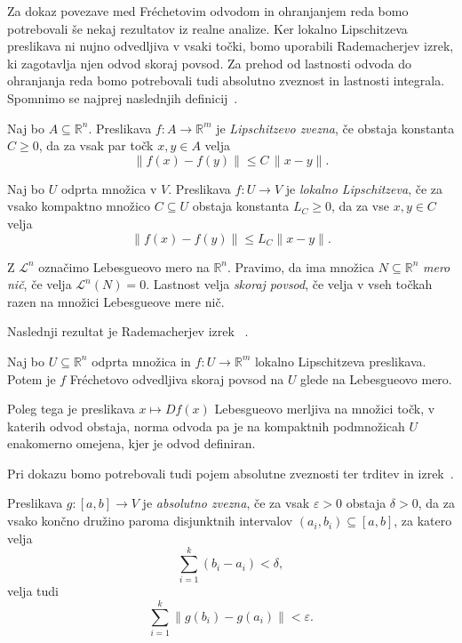\documentclass[mat2, tisk]{fmfdelo}
\begin{document}
Za dokaz povezave med Fréchetovim odvodom in ohranjanjem
reda bomo potrebovali še nekaj rezultatov iz realne analize.
Ker lokalno Lipschitzeva preslikava ni nujno odvedljiva
v vsaki točki, bomo uporabili Rademacherjev izrek, ki
zagotavlja njen odvod skoraj povsod. Za prehod od
lastnosti odvoda do ohranjanja reda bomo potrebovali
tudi absolutno zveznost in lastnosti integrala.
Spomnimo se najprej naslednjih definicij~\cite{Evans}.
\begin{definicija}
Naj bo $A \subseteq \mathbb{R}^n$. Preslikava $f \colon A \to \mathbb{R}^m$
je \emph{Lipschitzevo zvezna}, če obstaja konstanta $C \geq 0$, da za vsak par točk $x, y \in A$ velja
\[
\|f(x)-f(y)\| \leq C\,\|x-y\|.
\]
\end{definicija}

\begin{definicija}
 Naj bo $U$ odprta množica v $V$. Preslikava $f:U\to V$ je \emph{lokalno Lipschitzeva}, če za vsako kompaktno množico $C\subseteq U$
obstaja konstanta $L_C\geq 0$, da za vse $x,y\in C$ velja
\[
\|f(x)-f(y)\|\leq L_C\|x-y\|.
\]
\end{definicija}

Z $\mathcal{L}^n$ označimo Lebesgueovo mero na
$\mathbb{R}^n$. Pravimo, da ima množica
$N \subseteq \mathbb{R}^n$ \emph{mero nič}, če velja
$\mathcal{L}^n(N)=0$.
Lastnost velja \emph{skoraj povsod}, če velja v vseh
točkah razen na množici Lebesgueove mere nič.

Naslednji rezultat je Rademacherjev izrek
~\cite[izrek~3.2]{Evans}.

\begin{izrek}\label{Radamach}
Naj bo $U \subseteq \mathbb{R}^n$ odprta množica in
$f \colon U \to \mathbb{R}^m$ lokalno Lipschitzeva
preslikava. Potem je $f$ Fréchetovo odvedljiva
skoraj povsod na $U$ glede na Lebesgueovo mero.
\end{izrek}

Poleg tega je preslikava $x \mapsto Df(x)$
Lebesgueovo merljiva na množici točk, v katerih
odvod obstaja, norma odvoda pa je na kompaktnih
podmnožicah $U$ enakomerno omejena, kjer je
odvod definiran.

Pri dokazu bomo potrebovali tudi pojem absolutne
zveznosti ter trditev in izrek~\cite{rudin1987real}.

\begin{definicija}
Preslikava $g \colon [a,b] \to V$ je
\emph{absolutno zvezna}, če za vsak $\varepsilon>0$
obstaja $\delta>0$, da za vsako končno družino
paroma disjunktnih intervalov
$(a_i,b_i) \subseteq [a,b]$, za katero velja
\[
\sum_{i=1}^{k}(b_i-a_i)<\delta,
\]
velja tudi
\[
\sum_{i=1}^{k}\|g(b_i)-g(a_i)\|<\varepsilon.
\]
\end{definicija}
\end{document}

